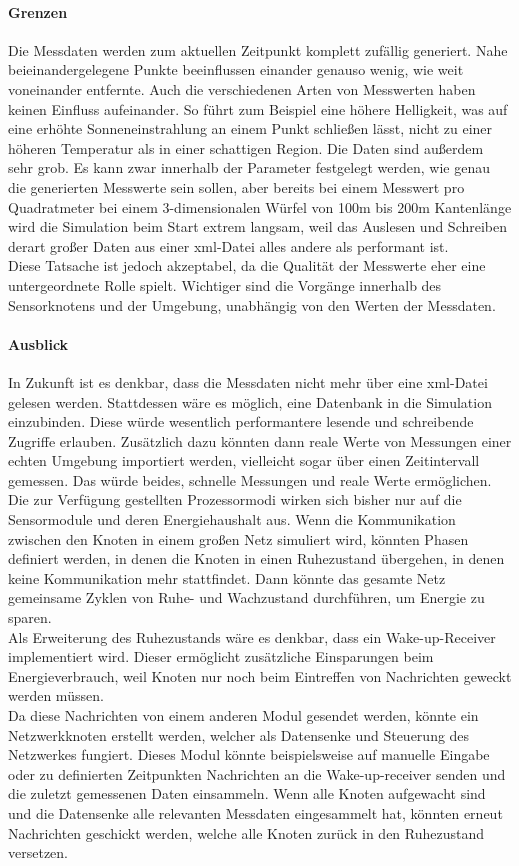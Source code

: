 \paragraph{Grenzen}
Die Messdaten werden zum aktuellen Zeitpunkt komplett zufällig generiert. Nahe beieinandergelegene Punkte beeinflussen einander genauso wenig, wie weit voneinander entfernte. Auch die verschiedenen Arten von Messwerten haben keinen Einfluss aufeinander. So führt zum Beispiel eine höhere Helligkeit, was auf eine erhöhte Sonneneinstrahlung an einem Punkt schließen lässt, nicht zu einer höheren Temperatur als in einer schattigen Region. Die Daten sind außerdem sehr grob. Es kann zwar innerhalb der Parameter festgelegt werden, wie genau die generierten Messwerte sein sollen, aber bereits bei einem Messwert pro Quadratmeter bei einem 3-dimensionalen Würfel von 100m bis 200m Kantenlänge wird die Simulation beim Start extrem langsam, weil das Auslesen und Schreiben derart großer Daten aus einer xml-Datei alles andere als performant ist. \\
Diese Tatsache ist jedoch akzeptabel, da die Qualität der Messwerte eher eine untergeordnete Rolle spielt. Wichtiger sind die Vorgänge innerhalb des Sensorknotens und der Umgebung, unabhängig von den Werten der Messdaten.

\paragraph{Ausblick}
In Zukunft ist es denkbar, dass die Messdaten nicht mehr über eine xml-Datei gelesen werden. Stattdessen wäre es möglich, eine Datenbank in die Simulation einzubinden. Diese würde wesentlich performantere lesende und schreibende Zugriffe erlauben. Zusätzlich dazu könnten dann reale Werte von Messungen einer echten Umgebung importiert werden, vielleicht sogar über einen Zeitintervall gemessen. Das würde beides, schnelle Messungen und reale Werte ermöglichen.\\
Die zur Verfügung gestellten Prozessormodi wirken sich bisher nur auf die Sensormodule und deren Energiehaushalt aus. Wenn die Kommunikation zwischen den Knoten in einem großen Netz simuliert wird, könnten Phasen definiert werden, in denen die Knoten in einen Ruhezustand übergehen, in denen keine Kommunikation mehr stattfindet. Dann könnte das gesamte Netz gemeinsame Zyklen von Ruhe- und Wachzustand durchführen, um Energie zu sparen.\\
Als Erweiterung des Ruhezustands wäre es denkbar, dass ein Wake-up-Receiver implementiert wird. Dieser ermöglicht zusätzliche Einsparungen beim Energieverbrauch, weil Knoten nur noch beim Eintreffen von Nachrichten geweckt werden müssen.\\
Da diese Nachrichten von einem anderen Modul gesendet werden, könnte ein Netzwerkknoten erstellt werden, welcher als Datensenke und Steuerung des Netzwerkes fungiert. Dieses Modul könnte beispielsweise auf manuelle Eingabe oder zu definierten Zeitpunkten Nachrichten an die Wake-up-receiver senden und die zuletzt gemessenen Daten einsammeln. Wenn alle Knoten aufgewacht sind und die Datensenke alle relevanten Messdaten eingesammelt hat, könnten erneut Nachrichten geschickt werden, welche alle Knoten zurück in den Ruhezustand versetzen.